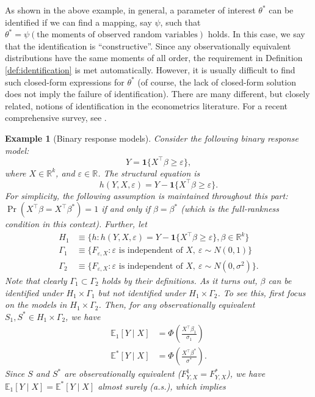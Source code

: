\documentclass[10.5pt, A4paper, openany, uplatex]{book}
\newcommand{\mbf}{\mathbf}
\newcommand{\mbb}{\mathbb}
\newcommand{\eps}{\varepsilon}
\newcommand{\E}{\mathbb{E}}
\newtheorem{example}[theorem]{Example}
\numberwithin{equation}{section}
\begin{document}
As shown in the above example, in general, a parameter of interest $\theta^*$ can be identified if we can find a mapping, say $\psi$, such that $\theta^* = \psi(\text{the moments of observed random variables})$ holds.
In this case, we say that the identification is ``constructive''.
Since any observationally equivalent distributions have the same moments of all order, the requirement in Definition \ref{def:identification} is met automatically.
However, it is usually difficult to find such closed-form expressions for $\theta^*$ (of course, the lack of closed-form solution does not imply the failure of identification). 
There are many different, but closely related, notions of identification in the econometrics literature.
For a recent comprehensive survey, see \cite{lewbel2019identification}.

\begin{example}[Binary response models]\upshape
Consider the following binary response model:
\[
	Y = \mbf{1}\{ X^\top \beta \ge \eps\},
\]
where $X \in \mbb{R}^k$, and $\eps \in \mbb{R}$.
The structural equation is
\[
	h(Y, X, \eps) = Y - \mbf{1}\{ X^\top \beta \ge \eps \}.
\]
For simplicity, the following assumption is maintained throughout this part: $\Pr(X^\top \beta = X^\top \beta^*) = 1$
if and only if  $\beta =  \beta^*$ (which is the full-rankness condition in this context).
Further, let
\begin{align*}
	H_1 &
	\equiv \{h : h(Y, X, \eps) = Y - \mbf{1}\{ X^\top \beta \ge \eps\},  \beta \in \mbb{R}^k \}\\
	\Gamma_1 
	& \equiv \{F_{\eps,X} : \eps \text{ is independent of } X, \: \eps \sim N(0, 1)\} \\
	\Gamma_2
	& \equiv \{F_{\eps,X} : \eps \text{ is independent of } X, \: \eps \sim N(0, \sigma^2)\}.
\end{align*}
Note that clearly $\Gamma_1 \subset \Gamma_2$ holds by their definitions.
As it turns out,  $\beta$ can be identified under $H_1 \times \Gamma_1$ but not identified under $H_1 \times \Gamma_2$.
To see this, first focus on the models in $H_1 \times \Gamma_2$.
Then, for any observationally equivalent $S_1, S^* \in H_1 \times \Gamma_2$, we have
\begin{align*}
	\E_1[Y \mid X] 
	& = \Phi \left(\frac{X^\top \beta_1}{\sigma_1} \right) \\
	\E^*[Y \mid X]
	& = \Phi \left(\frac{X^\top \beta^*}{\sigma^*} \right).
\end{align*}
Since $S$ and $S^*$ are observationally equivalent ($F^1_{Y,X} = F^*_{Y,X}$), we have $\E_1[Y \mid X] = \E^*[Y \mid X]$ almost surely (a.s.), which implies

\end{example}
\end{document}
